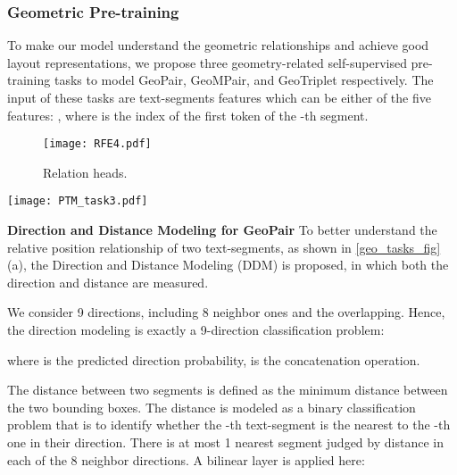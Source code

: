 \documentclass[10pt,twocolumn,letterpaper]{article}
\begin{document}
\subsubsection{Geometric Pre-training}
\label{sec:geo_tasks}


To make our model understand the geometric relationships and achieve good layout representations, we propose three geometry-related self-supervised pre-training tasks to model GeoPair, GeoMPair, and GeoTriplet respectively.
The input of these tasks are text-segments features  which can be either of the five features: , where  is the index of the first token of the -th segment.


\begin{figure}[tp]
  \centering
\texttt{[image: RFE4.pdf]}
  \caption{Relation heads.}
  \label{task_head_fig}
  \vspace{-3mm}
\end{figure}

\begin{figure*}[tp]
  \centering
  \texttt{[image: PTM\_task3.pdf]}
\vspace{-3mm}
  \caption{Geometric pre-training.}
  \label{geo_tasks_fig}
  \vspace{-6mm}
\end{figure*}



\noindent\textbf{Direction and Distance Modeling for GeoPair} To better understand the relative position relationship of two text-segments, as shown in \cref{geo_tasks_fig}(a), the Direction and Distance Modeling (DDM) is proposed, in which both the direction and distance are measured.





We consider 9 directions, including 8 neighbor ones\cite{luo2020merge} and the overlapping.
Hence, the direction modeling is exactly a 9-direction classification problem:


where  is the predicted direction probability,  is the concatenation operation.

The distance between two segments is defined as the minimum distance between the two bounding boxes\cite{luo2020merge}.
The distance is modeled as a binary classification problem that is to identify whether the -th text-segment is the nearest to the -th one in their direction. There is at most 1 nearest segment judged by distance in each of the 8 neighbor directions.
A bilinear layer is applied here:
\end{document}
